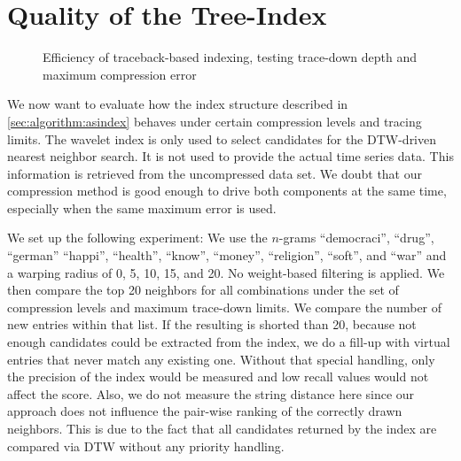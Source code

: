 \section{Quality of the Tree-Index}
\label{sec:evaluation:tb}

\begin{figure}
    \centering
    
    \caption[Efficiency of tracer, testing depth filter + compression rate]{Efficiency of traceback-based indexing, testing trace-down depth and maximum compression error}\label{fig:tbindex}
\end{figure}

We now want to evaluate how the index structure described in \autoref{sec:algorithm:asindex} behaves under certain compression levels and tracing limits. The wavelet index is only used to select candidates for the DTW-driven nearest neighbor search. It is not used to provide the actual time series data. This information is retrieved from the uncompressed data set. We doubt that our compression method is good enough to drive both components at the same time, especially when the same maximum error is used.

We set up the following experiment: We use the $n$-grams \enquote{democraci}, \enquote{drug}, \enquote{german} \enquote{happi}, \enquote{health}, \enquote{know}, \enquote{money}, \enquote{religion}, \enquote{soft}, and \enquote{war} and a warping radius of \num{0}, \num{5}, \num{10}, \num{15}, and \num{20}. No weight-based filtering is applied. We then compare the top \num{20} neighbors for all combinations under the set of compression levels and maximum trace-down limits. We compare the number of new entries within that list. If the resulting is shorted than \num{20}, because not enough candidates could be extracted from the index, we do a fill-up with virtual entries that never match any existing one. Without that special handling, only the precision of the index would be measured and low recall values would not affect the score. Also, we do not measure the string distance here since our approach does not influence the pair-wise ranking of the correctly drawn neighbors. This is due to the fact that all candidates returned by the index are compared via DTW without any priority handling.

